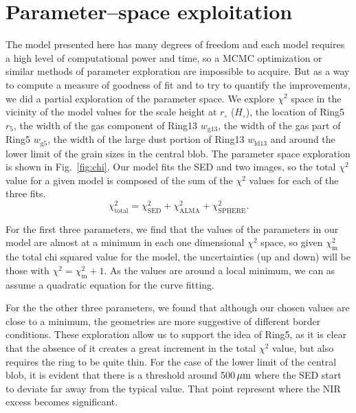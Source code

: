 \documentclass[fleqn,usenatbib,useAMS]{mnras}
\begin{document}

\appendix

\section{Parameter--space exploitation} \label{sec:Appendix}

The model presented here has many degrees of freedom and each model requires a high level of computational power and time, so a MCMC optimization or similar methods of parameter exploration are impossible to acquire. But as a way to compute a measure of goodness of fit and to try to quantify the improvements, we did a partial exploration of the parameter space. We explore $\chi^2$ space in the vicinity of the model values for the scale height at $r_\circ$ ($H_\circ$), the location of Ring5 $r_5$, the width of the gas component of Ring13 $w_{\mathrm{g13}}$, the width of the gas part of Ring5 $w_{\mathrm{g5}}$, the width of the large dust portion of Ring13 $w_{\mathrm{ld13}}$ and around the lower limit of the grain sizes in the central blob. The parameter space exploration is shown in Fig.~\ref{fig:chi}. Our model fits the SED and two images, so the total $\chi^2$ value for a given model is composed of the sum of the $\chi^2$ values for each of the three fits.
\begin{equation}
    \chi^2_{\mathrm{total}}=\chi^2_{\mathrm{SED}}+\chi^2_{\mathrm{ALMA}}+\chi^2_{\mathrm{SPHERE}}.
\end{equation}

For the first three parameters, we find that the values of the parameters in our model are almost at a minimum in each one dimensional $\chi^2$ space, so given $\chi^2_\mathrm{m}$ the total chi squared value for the model, the uncertainties (up and down) will be those with $\chi^2=\chi^2_\mathrm{m}+1$. As the values are around a local minimum, we can as assume a quadratic equation for the curve fitting.

For the the other three parameters, we found that although our chosen values are close to a minimum, the geometries are more suggestive of different border conditions. These exploration allow us to support the idea of Ring5, as it is clear that the absence of it creates a great increment in the total $\chi^2$ value, but also requires the ring to be quite thin. For the case of the lower limit of the central blob, it is evident that there is a threshold around 500\,$\hbox{$\mu$m}$ where the SED start to deviate far away from the typical value. That point represent where the NIR excess becomes significant.
\end{document}
